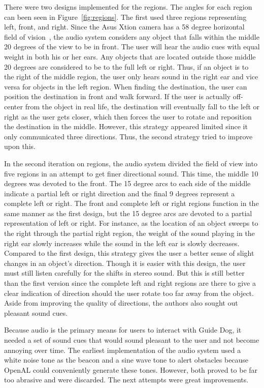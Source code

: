 There were two designs implemented for the regions. The angles for each region 
can been seen in Figure~\ref{fig:regions}. The first used three regions 
representing left, front, and right. Since the Asus Xtion camera has a 58 degree 
horizontal field of vision~\cite{xtion-website}, the audio system considers any 
object that falls within the middle 20 degrees of the view to be in front. The 
user will hear the audio cues with equal weight in both his or her ears. Any 
objects that are located outside those middle 20 degrees are considered to be to 
the full left or right. Thus, if an object is to the right of the middle region, 
the user only hears sound in the right ear and vice versa for objects in the 
left region. When finding the destination, the user can position the destination 
in front and walk forward. If the user is actually off-center from the object in 
real life, the destination will eventually fall to the left or right as the user 
gets closer, which then forces the user to rotate and reposition the destination in the
middle. However, this strategy appeared limited since it only communicated
three directions. Thus, the second strategy tried to improve upon this.

In the second iteration on regions, the audio system divided the field of view
into five regions in an attempt to get finer directional sound. This time, the
middle 10 degrees was devoted to the front. The 15 degree arcs to each side of
the middle indicate a partial left or right direction and the final 9 degrees
represent a complete left or right. The front and complete left or right regions 
function in the same manner as the first design, but the 15 degree arcs are 
devoted to a partial representation of left or right. For instance, as the
location of an object sweeps to the right through the partial right region, the 
weight of the sound playing in the right ear slowly increases while the sound in
the left ear is slowly decreases. Compared to the first design, this strategy 
gives the user a better sense of slight changes in an object's direction. Though
it is easier with this design, the user must still listen carefully for the
shifts in stereo sound. But this is still better than the first version since the
complete left and right regions are there to give a clear indication of direction
should the user rotate too far away from the object. Aside from improving the
quality of directions, the authors also sought out pleasant sound cues.

Because audio is the primary means for users to interact with Guide Dog, it
needed a set of sound cues that would sound pleasant to the user and not become
annoying over time. The earliest implementation of the audio system used a
white noise tone as the beacon and a sine wave tone to alert obstacles because
OpenAL could conveniently generate these tones. However, both proved to be far
too abrasive and were discarded. The next attempts were great improvements.

